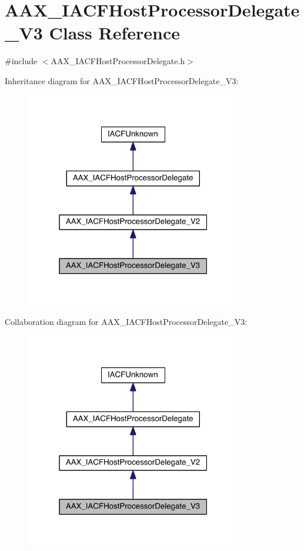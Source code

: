 \hypertarget{a00070}{}\section{A\+A\+X\+\_\+\+I\+A\+C\+F\+Host\+Processor\+Delegate\+\_\+\+V3 Class Reference}
\label{a00070}


{\ttfamily \#include $<$A\+A\+X\+\_\+\+I\+A\+C\+F\+Host\+Processor\+Delegate.\+h$>$}



Inheritance diagram for A\+A\+X\+\_\+\+I\+A\+C\+F\+Host\+Processor\+Delegate\+\_\+\+V3\+:
\nopagebreak
\begin{figure}[H]
\begin{center}
\leavevmode
\includegraphics[width=268pt]{a00553}
\end{center}
\end{figure}


Collaboration diagram for A\+A\+X\+\_\+\+I\+A\+C\+F\+Host\+Processor\+Delegate\+\_\+\+V3\+:
\nopagebreak
\begin{figure}[H]
\begin{center}
\leavevmode
\includegraphics[width=268pt]{a00554}
\end{center}
\end{figure}


